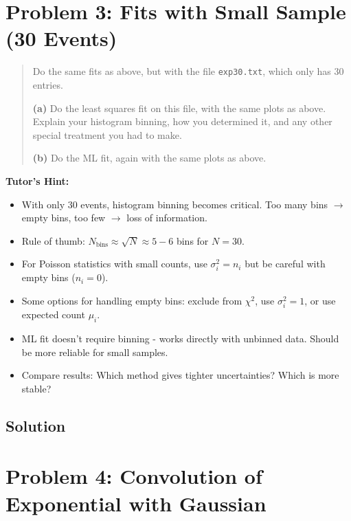 \documentclass[11pt]{article}
\begin{document}
\section{Problem 3: Fits with Small Sample (30 Events)}

\begin{quote}
    Do the same fits as above, but with the file \texttt{exp30.txt}, which only has 30 entries.

    \textbf{(a)} Do the least squares fit on this file, with the same plots as above. Explain your histogram binning, how you determined it, and any other special treatment you had to make.

    \textbf{(b)} Do the ML fit, again with the same plots as above.
\end{quote}

\textbf{Tutor's Hint:}
\begin{itemize}
    \item With only 30 events, histogram binning becomes critical. Too many bins $\rightarrow$ empty bins, too few $\rightarrow$ loss of information.
    \item Rule of thumb: $N_{\text{bins}} \approx \sqrt{N} \approx 5-6$ bins for $N=30$.
    \item For Poisson statistics with small counts, use $\sigma_i^2 = n_i$ but be careful with empty bins ($n_i = 0$).
    \item Some options for handling empty bins: exclude from $\chi^2$, use $\sigma_i^2 = 1$, or use expected count $\mu_i$.
    \item ML fit doesn't require binning - works directly with unbinned data. Should be more reliable for small samples.
    \item Compare results: Which method gives tighter uncertainties? Which is more stable?
\end{itemize}

\subsection{Solution}


\section{Problem 4: Convolution of Exponential with Gaussian}
\end{document}
